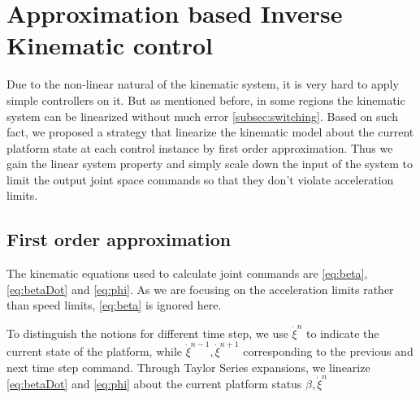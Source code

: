 \chapter{Approximation based Inverse Kinematic control}
\label{cha:inverseKinematics}
Due to the non-linear natural of the kinematic system, it is very hard to apply simple controllers on it. But as mentioned before, in some regions the kinematic system can be linearized without much error \cref{subsec:switching}. Based on such fact, we proposed a strategy that linearize the kinematic model about the current platform state at each control instance by first order approximation. Thus we gain the linear system property and simply scale down the input of the system to limit the output joint space commands so that they don't violate acceleration limits.


\section{First order approximation}
\label{sec:firstOrderApp}
The kinematic equations used to calculate joint commands are \cref{eq:beta},\cref{eq:betaDot} and \cref{eq:phi}. As we are focusing on the acceleration limits rather than speed limits, \cref{eq:beta} is ignored here.

To distinguish the notions for different time step, we use $\dot{\xi}^n$ to indicate the current state of the platform, while $\dot{\xi}^{n-1},\dot{\xi}^{n+1}$ corresponding to the previous and next time step command.
Through Taylor Series expansions, we linearize \cref{eq:betaDot} and \cref{eq:phi} about the current platform status $\beta, \dot{\xi}^{n}$


